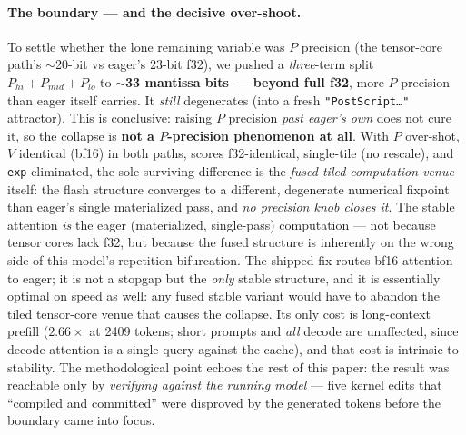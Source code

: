 \documentclass[11pt]{article}
\newcommand{\x}{\ensuremath{\times}}
\begin{document}
\paragraph{The boundary --- and the decisive over-shoot.} To settle whether the lone remaining
variable was $P$ precision (the tensor-core path's $\sim$20-bit vs eager's 23-bit f32), we pushed a
\emph{three}-term split $P_{hi}{+}P_{mid}{+}P_{lo}$ to $\sim$\textbf{33 mantissa bits --- beyond full
f32}, more $P$ precision than eager itself carries. It \emph{still} degenerates (into a fresh
\texttt{"PostScript\dots"} attractor). This is conclusive: raising $P$ precision \emph{past eager's
own} does not cure it, so the collapse is \textbf{not a $P$-precision phenomenon at all}. With $P$
over-shot, $V$ identical (bf16) in both paths, scores f32-identical, single-tile (no rescale), and
\texttt{exp} eliminated, the sole surviving difference is the \emph{fused tiled computation venue}
itself: the flash structure converges to a different, degenerate numerical fixpoint than eager's
single materialized pass, and \emph{no precision knob closes it}. The stable attention \emph{is} the
eager (materialized, single-pass) computation --- not because tensor cores lack f32, but because the
fused structure is inherently on the wrong side of this model's repetition bifurcation. The shipped
fix routes bf16 attention to eager; it is not a stopgap but the \emph{only} stable structure, and it
is essentially optimal on speed as well: any fused stable variant would have to abandon the tiled
tensor-core venue that causes the collapse. Its only cost is
long-context prefill ($2.66\x$ at 2409 tokens; short prompts and \emph{all} decode are unaffected,
since decode attention is a single query against the cache), and that cost is intrinsic to stability.
The methodological point echoes the rest of this paper: the result was reachable only by
\emph{verifying against the running model} --- five kernel edits that ``compiled and committed''
were disproved by the generated tokens before the boundary came into focus.
\end{document}
